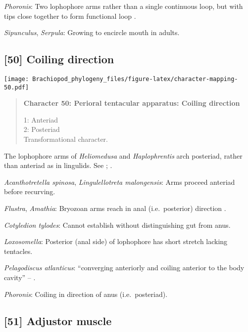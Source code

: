 \documentclass[openany]{book}
\theoremstyle{definition}
\theoremstyle{definition}
\theoremstyle{definition}
\theoremstyle{remark}
\begin{document}
\hypertarget{Phoronis-coding-49}{}
\emph{Phoronis}: Two lophophore arms rather than a single continuous
loop, but with tips close together to form functional loop
\citep{Torrey1901}.

\hypertarget{Serpula-coding-49}{}
\emph{Sipunculus}, \emph{Serpula}: Growing to encircle mouth in adults.

\subsection*{{[}50{]} Coiling direction}\label{coiling-direction}

\texttt{[image: Brachiopod\_phylogeny\_files/figure-latex/character-mapping-50.pdf]}

\begin{quote}
\textbf{Character 50: Perioral tentacular apparatus: Coiling direction}

1: Anteriad\\
2: Posteriad\\
Transformational character.
\end{quote}

The lophophore arms of \emph{Heliomedusa} and \emph{Haplophrentis} arch
posteriad, rather than anteriad as in lingulids. See
\citet{Zhang2009Architectureand}; \citet{Moysiuk2017Hyolithsare}.

\hypertarget{Acanthotretella_spinosa-coding-50}{}
\emph{Acanthotretella spinosa}, \emph{Lingulellotreta malongensis}: Arms
proceed anteriad before recurving.

\hypertarget{Amathia-coding-50}{}
\emph{Flustra}, \emph{Amathia}: Bryozoan arms reach in anal
(i.e.~posterior) direction \citep{Shunkina2015}.

\hypertarget{Cotyledion_tylodes-coding-50}{}
\emph{Cotyledion tylodes}: Cannot establish without distinguishing gut
from anus.

\hypertarget{Loxosomella-coding-50}{}
\emph{Loxosomella}: Posterior (anal side) of lophophore has short
stretch lacking tentacles.

\hypertarget{Pelagodiscus_atlanticus-coding-50}{}
\emph{Pelagodiscus atlanticus}: ``converging anteriorly and coiling
anterior to the body cavity'' -- \citet{Zhang2009Architectureand}.

\hypertarget{Phoronis-coding-50}{}
\emph{Phoronis}: Coiling in direction of anus (i.e.~posteriad).

\subsection*{{[}51{]} Adjustor muscle}\label{adjustor-muscle}
\end{document}
